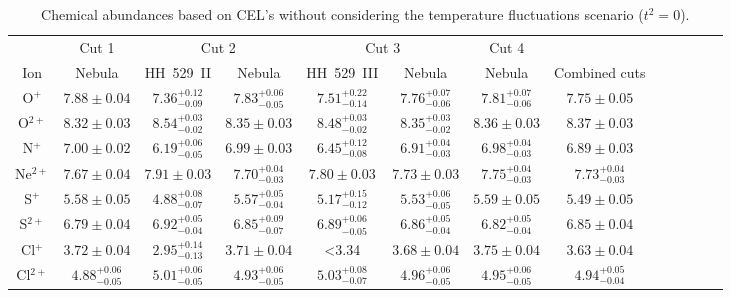 \documentclass[fleqn,usenatbib]{mnras}
\begin{document}
\begin{table*}
\centering
\caption{Chemical abundances based on CEL's without considering the temperature fluctuations scenario ($t^2=0$).}
\label{tab:cels_abundances}
\begin{adjustbox}{width=\textwidth}
\begin{tabular}{ccccccccccccc}
\hline
 & \multicolumn{1}{c}{Cut 1} & \multicolumn{2}{c}{Cut 2} & \multicolumn{2}{c}{Cut 3} & \multicolumn{1}{c}{Cut 4} \\
Ion &  Nebula & HH~529~II &  Nebula & HH~529~III &  Nebula &  Nebula & Combined cuts\\
\hline


O$^{+}$ & $7.88 \pm 0.04$ & $7.36^{+0.12} _{-0.09}$  & $7.83^{+0.06} _{-0.05}$ & $7.51^{+0.22} _{-0.14}$ & $7.76^{+0.07} _{-0.06}$ & $7.81^{+0.07} _{-0.06}$& $7.75 \pm 0.05$ \\

O$^{2+}$ & $8.32 \pm 0.03$ & $8.54^{+0.03} _{-0.02}$ & $8.35 \pm 0.03$ & $8.48^{+0.03} _{-0.02}$ & $8.35^{+0.03} _{-0.02}$  & $8.36 \pm 0.03$ & $8.37 \pm 0.03$   \\

N$^{+}$  & $7.00 \pm 0.02$ & $6.19^{+0.06} _{-0.05}$  & $6.99 \pm 0.03$ &  $6.45^{+0.12} _{-0.08}$  & $6.91^{+0.04} _{-0.03}$ & $6.98^{+0.04} _{-0.03}$ & $6.89 \pm 0.03$  \\

Ne$^{2+}$ & $7.67 \pm 0.04$ & $7.91 \pm 0.03$ & $7.70^{+0.04} _{-0.03}$ &  $7.80 \pm 0.03 $  & $7.73 \pm 0.03$ & $7.75^{+0.04} _{-0.03}$ & $7.73^{+0.04} _{-0.03}$  \\

S$^{+}$&  $5.58 \pm 0.05$ & $4.88^{+0.08} _{-0.07}$ & $5.57^{+0.05} _{-0.04}$ &  $5.17^{+0.15} _{-0.12}$ & $5.53^{+0.06} _{-0.05}$ & $5.59 \pm 0.05$ & $5.49 \pm 0.05$  \\

S$^{2+}$&  $6.79 \pm 0.04$ & $6.92^{+0.05} _{-0.04}$ & $6.85^{+0.09} _{-0.07}$& $6.89^{+0.06} _{-0.05}$  & $6.86^{+0.05} _{-0.04}$& $6.82^{+0.05} _{-0.04}$& $6.85 \pm 0.04$\\

Cl$^{+}$ & $3.72 \pm 0.04$ & $2.95^{+0.14} _{-0.13}$ & $3.71 \pm 0.04$ & <3.34& $3.68 \pm 0.04$ & $3.75 \pm 0.04$ & $3.63 \pm 0.04$  \\

Cl$^{2+}$ & $4.88^{+0.06} _{-0.05}$ & $5.01^{+0.06} _{-0.05}$ & $4.93^{+0.06} _{-0.05}$ & $5.03^{+0.08} _{-0.07}$   &$4.96^{+0.06} _{-0.05}$&$4.95^{+0.06} _{-0.05}$&$4.94^{+0.05} _{-0.04}$ \\


\end{tabular}
\end{adjustbox}
\end{table*}
\end{document}

